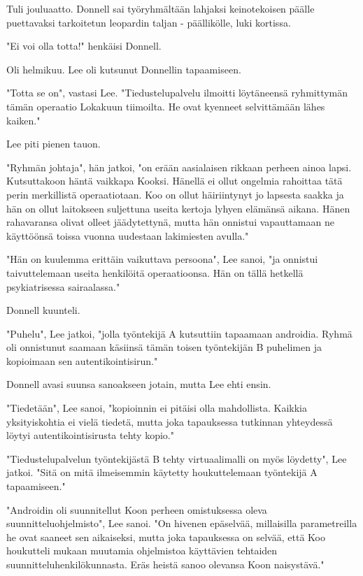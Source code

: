 Tuli jouluaatto. Donnell sai työryhmältään lahjaksi keinotekoisen päälle puettavaksi tarkoitetun leopardin taljan - päällikölle, luki kortissa.




\psep "Ei voi olla totta!" henkäisi Donnell.


Oli helmikuu. Lee oli kutsunut Donnellin tapaamiseen.


"Totta se on", vastasi Lee. "Tiedustelupalvelu ilmoitti löytäneensä ryhmittymän tämän operaatio Lokakuun tiimoilta. He ovat kyenneet selvittämään lähes kaiken."


Lee piti pienen tauon.


"Ryhmän johtaja", hän jatkoi, "on erään aasialaisen rikkaan perheen ainoa lapsi. Kutsuttakoon häntä vaikkapa Kooksi. Hänellä ei ollut ongelmia rahoittaa tätä perin merkillistä operaatiotaan. Koo on ollut häiriintynyt jo lapsesta saakka ja hän on ollut laitokseen suljettuna useita kertoja lyhyen elämänsä aikana. Hänen rahavaransa olivat olleet jäädytettynä, mutta hän onnistui vapauttamaan ne käyttöönsä toissa vuonna uudestaan lakimiesten avulla."


"Hän on kuulemma erittäin vaikuttava persoona", Lee sanoi, "ja onnistui taivuttelemaan useita henkilöitä operaatioonsa. Hän on tällä hetkellä psykiatrisessa sairaalassa."


Donnell kuunteli.


"Puhelu", Lee jatkoi, "jolla työntekijä A kutsuttiin tapaamaan androidia. Ryhmä oli onnistunut saamaan käsiinsä tämän toisen työntekijän B puhelimen ja kopioimaan sen autentikointisirun."


Donnell avasi suunsa sanoakseen jotain, mutta Lee ehti ensin.


"Tiedetään", Lee sanoi, "kopioinnin ei pitäisi olla mahdollista. Kaikkia yksityiskohtia ei vielä tiedetä, mutta joka tapauksessa tutkinnan yhteydessä löytyi autentikointisirusta tehty kopio."


"Tiedustelupalvelun työntekijästä B tehty virtuaalimalli on myös löydetty", Lee jatkoi. "Sitä on mitä ilmeisemmin käytetty houkuttelemaan työntekijä A tapaamiseen."


"Androidin oli suunnitellut Koon perheen omistuksessa oleva suunnitteluohjelmisto", Lee sanoi. "On hivenen epäselvää, millaisilla parametreilla he ovat saaneet sen aikaiseksi, mutta joka tapauksessa on selvää, että Koo houkutteli mukaan muutamia ohjelmistoa käyttävien tehtaiden suunnitteluhenkilökunnasta. Eräs heistä sanoo olevansa Koon naisystävä."


